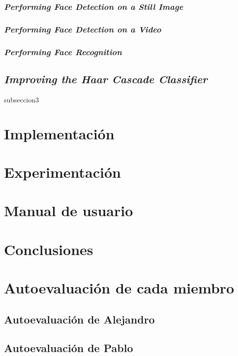 \documentclass[a4paper]{article}
\begin{document}
\subsubsection{\textit{Performing Face Detection on a Still Image}}

\subsubsection{\textit{Performing Face Detection on a Video}}

\subsubsection{\textit{Performing Face Recognition}}

\subsection{\textit{Improving the Haar Cascade Classifier}}

subseccion3

\section{Implementación}

\section{Experimentación}

\section{Manual de usuario}

\section{Conclusiones}

\section{Autoevaluación de cada miembro}

\subsection{Autoevaluación de Alejandro}

\subsection{Autoevaluación de Pablo}
\end{document}
